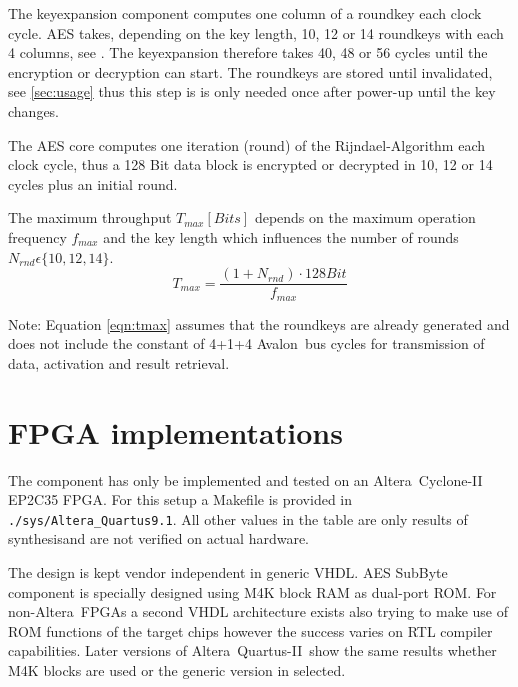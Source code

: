 \documentclass{ruschidoc}
\begin{document}
The keyexpansion component computes one column of a roundkey each clock cycle. AES takes, depending on the key length,
10, 12 or 14 roundkeys with each 4 columns, see \cite{NIST:Fips197}. The keyexpansion therefore takes 40, 48 or 56
cycles until the encryption or decryption can start. The roundkeys are stored until invalidated, see \ref{sec:usage}
thus this step is is only needed once after power-up until the key changes.

The AES core computes one iteration (round) of the Rijndael-Algorithm each clock cycle, thus a 128 Bit data block is
encrypted or decrypted in 10, 12 or 14 cycles plus an initial round.

The maximum throughput $T_{max}[Bits]$ depends on the maximum operation frequency $f_{max}$ and the key length which
influences the number of rounds $N_{rnd} \epsilon \lbrace 10,12,14 \rbrace $.
\begin{equation}
  T_{max}=\frac{ (1+N_{rnd}) \cdot 128 Bit}{f_{max}} 
\label{eqn:tmax}
\end{equation}

Note: Equation \ref{eqn:tmax} assumes that the roundkeys are already generated and does not include the constant of 4+1+4
Avalon\rtm\ bus cycles for transmission of data, activation and result retrieval.
\newpage
\section{FPGA implementations}
\label{sec:fpga}
The component has only be implemented and tested on an Altera\rtm\ Cyclone-II EP2C35
FPGA. For this setup a Makefile is provided in \texttt{./sys/Altera\_Quartus9.1}.  All
other values in the table are only results of synthesis\footnotemark[0] and are not
verified on actual hardware.


The design is kept vendor independent in generic VHDL. 
AES SubByte component is specially designed using M4K block RAM as dual-port ROM. For
non-Altera\rtm\ FPGAs a second VHDL architecture exists also trying to make use of
ROM functions of the target chips however the success varies on RTL compiler
capabilities. Later versions of  Altera\rtm\ Quartus-II\rtm\ show the same results whether M4K blocks are used or the generic version in selected.
\end{document}

